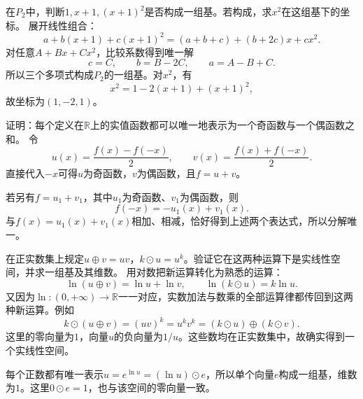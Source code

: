 在\(P_{2}\)中，判断\(1 , x + 1 , \left( x + 1 \right)^{2}\)是否构成一组基。若构成，求\(x^{2}\)在这组基下的坐标。
\solutionanswer
展开线性组合：
\[
a+b(x+1)+c(x+1)^2=(a+b+c)+(b+2c)x+cx^2.
\]
对任意\(A+Bx+Cx^2\)，比较系数得到唯一解
\[
c=C,\qquad b=B-2C,\qquad a=A-B+C.
\]
所以三个多项式构成\(P_2\)的一组基。对\(x^2\)，有
\[
x^2=1-2(x+1)+(x+1)^2,
\]
故坐标为\((1,-2,1)\)。


证明：每个定义在\(\mathbb{R}\)上的实值函数都可以唯一地表示为一个奇函数与一个偶函数之和。
\solutionanswer
令
\[
u(x)=\frac{f(x)-f(-x)}2,\qquad
v(x)=\frac{f(x)+f(-x)}2.
\]
直接代入\(-x\)可得\(u\)为奇函数，\(v\)为偶函数，且\(f=u+v\)。

若另有\(f=u_1+v_1\)，其中\(u_1\)为奇函数、\(v_1\)为偶函数，则
\[
f(-x)=-u_1(x)+v_1(x).
\]
与\(f(x)=u_1(x)+v_1(x)\)相加、相减，恰好得到上述两个表达式，所以分解唯一。


在正实数集上规定\(u \oplus v = u v\)，\(k \odot u = u^{k}\)。验证它在这两种运算下是实线性空间，并求一组基及其维数。
\solutionanswer
用对数把新运算转化为熟悉的运算：
\[
\ln(u\oplus v)=\ln u+\ln v,\qquad
\ln(k\odot u)=k\ln u.
\]
又因为\(\ln:(0,+\infty)\to\mathbb R\)一一对应，实数加法与数乘的全部运算律都传回到这两种新运算。例如
\[
k\odot(u\oplus v)=(uv)^k=u^kv^k
=(k\odot u)\oplus(k\odot v).
\]
这里的零向量为\(1\)，向量\(u\)的负向量为\(1/u\)。这些数均在正实数集中，故确实得到一个实线性空间。

每个正数都有唯一表示\(u=e^{\ln u}=(\ln u)\odot e\)，所以单个向量\(e\)构成一组基，维数为\(1\)。这里\(0\odot e=1\)，也与该空间的零向量一致。
\par
